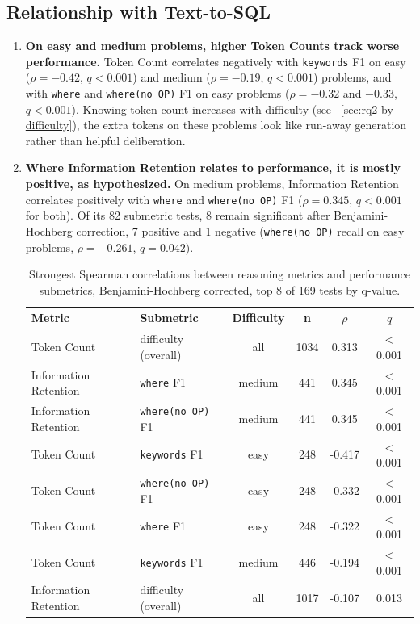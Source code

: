 \subsection{Relationship with Text-to-SQL}
\label{sec:rq2-relationship-correctness}

\begin{enumerate}
\item \label{item:rq2-finding-tokencount-disobey} \textbf{On easy and medium problems, higher Token Counts track worse performance.} Token Count correlates negatively with \texttt{keywords} F1 on easy ($\rho=-0.42$, $q<0.001$) and medium ($\rho=-0.19$, $q<0.001$) problems, and with \texttt{where} and \texttt{where(no OP)} F1 on easy problems ($\rho=-0.32$ and $-0.33$, $q<0.001$). Knowing token count increases with difficulty (see ~\ref{sec:rq2-by-difficulty}), the extra tokens on these problems look like run-away generation rather than helpful deliberation.
\item \label{item:rq2-finding-retention-performance} \textbf{Where Information Retention relates to performance, it is mostly positive, as hypothesized.} On medium problems, Information Retention correlates positively with \texttt{where} and \texttt{where(no OP)} F1 ($\rho=0.345$, $q<0.001$ for both). Of its 82 submetric tests, 8 remain significant after Benjamini-Hochberg correction, 7 positive and 1 negative (\texttt{where(no OP)} recall on easy problems, $\rho=-0.261$, $q=0.042$).

\begin{table}[H]
\centering
\footnotesize
\caption{Strongest Spearman correlations between reasoning metrics and performance submetrics, Benjamini-Hochberg corrected, top 8 of 169 tests by q-value.}
\label{tab:rq2-correlations}
\begin{tabular}{llcccc}
\toprule
Metric & Submetric & Difficulty & n & $\rho$ & $q$ \\
\midrule
Token Count & difficulty (overall) & all & 1034 & 0.313 & $<$0.001 \\
Information Retention & \texttt{where} F1 & medium & 441 & 0.345 & $<$0.001 \\
Information Retention & \texttt{where(no OP)} F1 & medium & 441 & 0.345 & $<$0.001 \\
Token Count & \texttt{keywords} F1 & easy & 248 & -0.417 & $<$0.001 \\
Token Count & \texttt{where(no OP)} F1 & easy & 248 & -0.332 & $<$0.001 \\
Token Count & \texttt{where} F1 & easy & 248 & -0.322 & $<$0.001 \\
Token Count & \texttt{keywords} F1 & medium & 446 & -0.194 & $<$0.001 \\
Information Retention & difficulty (overall) & all & 1017 & -0.107 & 0.013 \\
\bottomrule
\end{tabular}
\end{table}


\end{enumerate}
